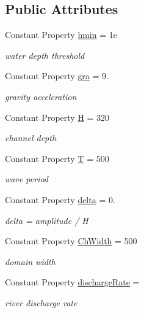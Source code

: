\subsection*{Public Attributes}
\begin{DoxyCompactItemize}
\item 
Constant Property \hyperlink{class_tidal_river_channel2d_a6c05c54f21e67c8f757b5909ee36485d}{hmin} = 1e
\begin{DoxyCompactList}\small\item\em water depth threshold \end{DoxyCompactList}\item 
Constant Property \hyperlink{class_tidal_river_channel2d_a25a6704c404b59f28c531d73ed3a04cb}{gra} = 9.
\begin{DoxyCompactList}\small\item\em gravity acceleration \end{DoxyCompactList}\item 
Constant Property \hyperlink{class_tidal_river_channel2d_a06ac276d7ceb09e64cfca7468e8edeab}{H} = 320
\begin{DoxyCompactList}\small\item\em channel depth \end{DoxyCompactList}\item 
Constant Property \hyperlink{class_tidal_river_channel2d_acfa9d9339d72192dda6ae999f6f1af1b}{T} = 500
\begin{DoxyCompactList}\small\item\em wave period \end{DoxyCompactList}\item 
Constant Property \hyperlink{class_tidal_river_channel2d_ab6b428ff0c7358f2bfce3cec8d86b2f1}{delta} = 0.
\begin{DoxyCompactList}\small\item\em delta = amplitude / H \end{DoxyCompactList}\item 
Constant Property \hyperlink{class_tidal_river_channel2d_adf33140e3f5ad0e57c26b73a23c23912}{Ch\+Width} = 500
\begin{DoxyCompactList}\small\item\em domain width \end{DoxyCompactList}\item 
Constant Property \hyperlink{class_tidal_river_channel2d_a257ccaf7a9d03b80cbb5a4b45b79721a}{discharge\+Rate} =
\begin{DoxyCompactList}\small\item\em river discharge rate \end{DoxyCompactList}\item 

\end{DoxyCompactItemize}
